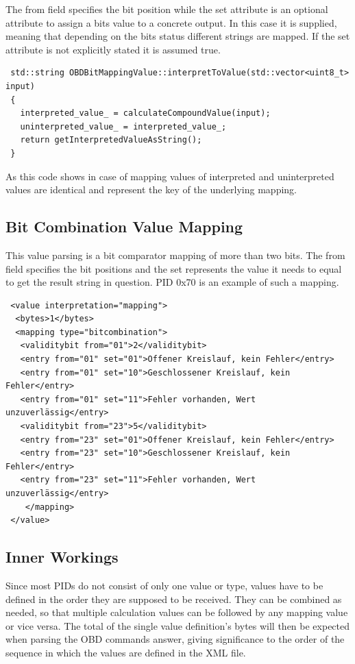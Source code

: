 The from field specifies the bit position while the set attribute is an optional attribute to assign a bits value to a concrete output. In this 
case it is supplied, meaning that depending  on the bits status different strings are mapped. If the set attribute is not explicitly stated it 
is assumed true.

\begin{verbatim}
 std::string OBDBitMappingValue::interpretToValue(std::vector<uint8_t> input)
 {
   interpreted_value_ = calculateCompoundValue(input);
   uninterpreted_value_ = interpreted_value_;
   return getInterpretedValueAsString();
 }
\end{verbatim}

As this code shows in case of mapping values of interpreted and uninterpreted values are identical and represent the key of the underlying mapping.

\subsection{Bit Combination Value Mapping}

This value parsing is a bit comparator mapping of more than two bits. The from field specifies the bit positions and the set represents the 
value it needs to equal to get the result string in question. PID 0x70 is an example of such a mapping.

\begin{verbatim}
 <value interpretation="mapping">
  <bytes>1</bytes>
  <mapping type="bitcombination">
   <validitybit from="01">2</validitybit>
   <entry from="01" set="01">Offener Kreislauf, kein Fehler</entry>
   <entry from="01" set="10">Geschlossener Kreislauf, kein Fehler</entry>
   <entry from="01" set="11">Fehler vorhanden, Wert unzuverlässig</entry>
   <validitybit from="23">5</validitybit>
   <entry from="23" set="01">Offener Kreislauf, kein Fehler</entry>
   <entry from="23" set="10">Geschlossener Kreislauf, kein Fehler</entry>
   <entry from="23" set="11">Fehler vorhanden, Wert unzuverlässig</entry>
    </mapping>    
 </value>
\end{verbatim}

\subsection{Inner Workings}

Since most PIDs do not consist of only one value or type, values have to be defined in the order they are supposed to be received. They can be 
combined as needed, so that multiple calculation values can be followed by any mapping value or vice versa. The total of the single value 
definition’s bytes will then be expected when parsing the OBD commands answer, giving significance to the order of the sequence in which the 
values are defined in the XML file.


